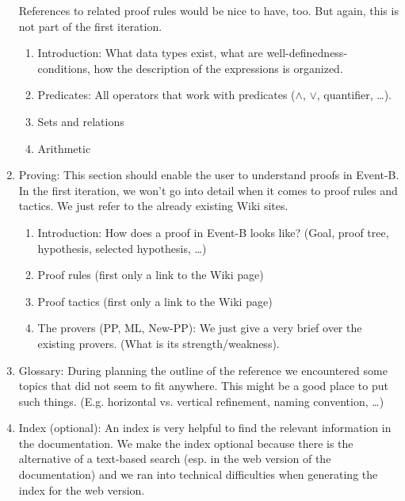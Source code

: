 \begin{enumerate}
  References to related proof rules would be nice to have, too. But again, this is not part of the first iteration.
  \begin{enumerate}
  \item Introduction: What data types exist, what are well-definedness-conditions, 
    how the description of the expressions is organized.
  \item Predicates: All operators that work with predicates ($\land$, $\lor$, quantifier, \ldots). 
  \item Sets and relations
  \item Arithmetic
  \end{enumerate}
\item Proving: This section should enable the user to understand proofs in Event-B.
  In the first iteration, we won't go into detail when it comes to proof rules and tactics. We
  just refer to the already existing Wiki sites.
  \begin{enumerate}
  \item Introduction: How does a proof in Event-B looks like? (Goal, proof tree, hypothesis, selected hypothesis, \ldots)
  \item Proof rules (first only a link to the Wiki page)
  \item Proof tactics (first only a link to the Wiki page)
  \item The provers (PP, ML, New-PP): We just give a very brief over the existing provers.
    (What is its strength/weakness).
  \end{enumerate}
\item Glossary:
  During planning the outline of the reference we encountered some
  topics that did not seem to fit anywhere. This might be a good place
  to put such things.
  (E.g. horizontal vs. vertical refinement, naming convention, \ldots)
\item Index (optional): 
  An index is very helpful to find the relevant information in the documentation.
  We make the index optional because there is the alternative of a text-based search (esp. in the
  web version of the documentation) and we ran into technical difficulties when generating the 
  index for the web version.
\end{enumerate}

